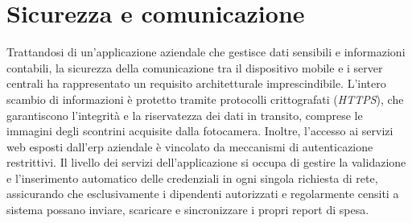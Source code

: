 \section{Sicurezza e comunicazione}
\noindent Trattandosi di un'applicazione aziendale che gestisce dati sensibili e informazioni contabili, la sicurezza della comunicazione tra il dispositivo mobile e i server centrali ha rappresentato un requisito architetturale imprescindibile.
L'intero scambio di informazioni è protetto tramite protocolli crittografati (\textit{HTTPS}), che garantiscono l'integrità e la riservatezza dei dati in transito, comprese le immagini degli scontrini acquisite dalla fotocamera. Inoltre, l'accesso ai servizi web esposti dall'\gls{erp} aziendale è vincolato da meccanismi di autenticazione restrittivi. Il livello dei servizi dell'applicazione si occupa di gestire la validazione e l'inserimento automatico delle credenziali in ogni singola richiesta di rete, assicurando che esclusivamente i dipendenti autorizzati e regolarmente censiti a sistema possano inviare, scaricare e sincronizzare i propri report di spesa.


\newpage